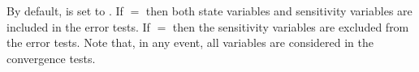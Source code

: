{
  By default,  is set to . 
  If $=$ then both state variables and
  sensitivity variables are included in the error tests. 
  If $=$ then the sensitivity variables are excluded from the 
  error tests. Note that, in any event, all variables are considered in the convergence 
  tests.
}

